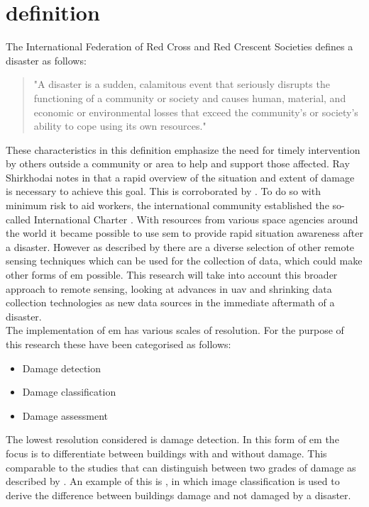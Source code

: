 \section{definition}\label{sec:def}
The International Federation of Red Cross and Red Crescent Societies \citeyearpar{IFRC2017} defines a disaster as follows: 
\begin{quote}
	"A disaster is a sudden, calamitous event that seriously disrupts the functioning of a community or society and causes human, material, and economic or environmental losses that exceed the community’s or society’s ability to cope using its own resources."
\end{quote}
These characteristics in this definition emphasize the need for timely intervention by others outside a community or area to help and support those affected. Ray Shirkhodai notes in \citet[p. i]{AlAchkar2008} that a rapid overview of the situation and extent of damage is necessary to achieve this goal. This is corroborated by \citet{Schweier2006}. To do so with minimum risk to aid workers, the international community established the so-called International Charter \citep{Bessis2003}. With resources from various space agencies around the world it became possible to use \ac{sem} to provide rapid situation awareness after a disaster. However as described by \citet{Kerle2008} there are a diverse selection of other remote sensing techniques which can be used for the collection of data, which could make other forms of \ac{em} possible. This research will take into account this broader approach to remote sensing, looking at advances in \ac{uav} and shrinking data collection technologies as new data sources in the immediate aftermath of a disaster.\\

The implementation of \ac{em} has various scales of resolution. For the purpose of this research these have been categorised as follows:

\begin{itemize}
	\item Damage detection
	\item Damage classification
	\item Damage assessment
\end{itemize}

The lowest resolution considered is damage detection. In this form of \ac{em} the focus is to differentiate between buildings with and without damage. This comparable to the studies that can distinguish between two grades of damage as described by \citet{Dong2013}. An example of this is \citet{Wang2012}, in which image classification is used to derive the difference between buildings damage and not damaged by a disaster.\\

